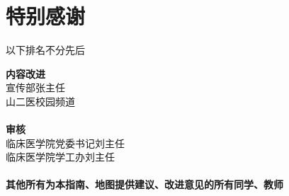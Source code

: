 \chapter*{特别感谢}
 {\centering 以下排名不分先后\\}
\noindent\begin{table*}[!htbp]
    \centering
    {\large \textbf{内容改进}\\
        宣传部张主任\\
        山二医校园频道\\
        \hspace*{\fill} \\
        \textbf{审核}\\
        临床医学院党委书记刘主任\\
        临床医学院学工办刘主任\\
        \hspace*{\fill} \\
        \textbf{其他所有为本指南、地图提供建议、改进意见的所有同学、教师}}
\end{table*}